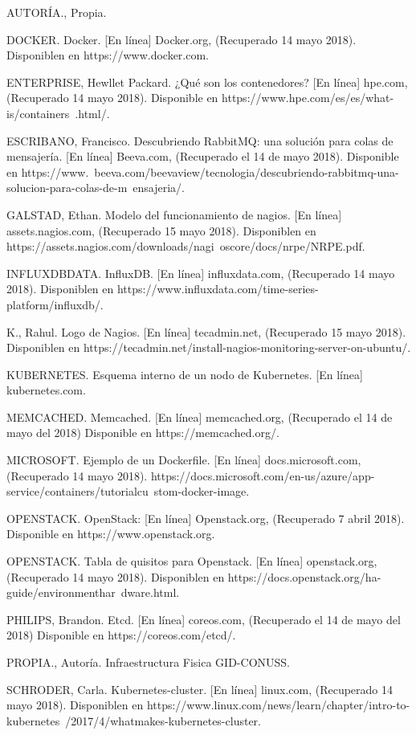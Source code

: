  AUTORÍA., Propia. 
 
DOCKER. Docker. [En línea] Docker.org, (Recuperado 14 mayo 2018). Disponiblen en https://www.docker.com. 

ENTERPRISE, Hewllet Packard. ¿Qué son los contenedores? [En línea] hpe.com, (Recuperado 14 mayo 2018). Disponible en https://www.hpe.com/es/es/what-is/containers\ .html/. 

ESCRIBANO, Francisco. Descubriendo RabbitMQ: una solución para colas de mensajería. [En línea] Beeva.com, (Recuperado el 14 de mayo 2018). Disponible en https://www.\ beeva.com/beevaview/tecnologia/descubriendo-rabbitmq-una-solucion-para-colas-de-m\ ensajeria/. 

GALSTAD, Ethan. Modelo del funcionamiento de nagios. [En línea] assets.nagios.com, (Recuperado 15 mayo 2018). Disponiblen en https://assets.nagios.com/downloads/nagi\ oscore/docs/nrpe/NRPE.pdf. 

INFLUXDBDATA. InfluxDB. [En línea] influxdata.com, (Recuperado 14 mayo 2018). Disponiblen en https://www.influxdata.com/time-series-platform/influxdb/.

 K., Rahul. Logo de Nagios. [En línea] tecadmin.net, (Recuperado 15 mayo 2018). Disponiblen en https://tecadmin.net/install-nagios-monitoring-server-on-ubuntu/. 
 
 KUBERNETES. Esquema interno de un nodo de Kubernetes. [En línea] kubernetes.com. 
 
MEMCACHED. Memcached. [En línea] memcached.org, (Recuperado el 14 de mayo del 2018) Disponible en https://memcached.org/. 

MICROSOFT. Ejemplo de un Dockerfile. [En línea] docs.microsoft.com, (Recuperado 14 mayo 2018). https://docs.microsoft.com/en-us/azure/app-service/containers/tutorialcu\ stom-docker-image. 

OPENSTACK. OpenStack: [En línea] Openstack.org, (Recuperado 7 abril 2018). Disponible en https://www.openstack.org. 

OPENSTACK. Tabla de quisitos para Openstack. [En línea] openstack.org, (Recuperado 14 mayo 2018). Disponiblen en https://docs.openstack.org/ha-guide/environmenthar\ dware.html. 

PHILIPS, Brandon. Etcd. [En línea] coreos.com, (Recuperado el 14 de mayo del 2018) Disponible en https://coreos.com/etcd/. 

PROPIA., Autoría. Infraestructura Fisica GID-CONUSS. 

SCHRODER, Carla. Kubernetes-cluster. [En línea] linux.com, (Recuperado 14 mayo 2018). Disponiblen en https://www.linux.com/news/learn/chapter/intro-to-kubernetes\ /2017/4/whatmakes-kubernetes-cluster. 

